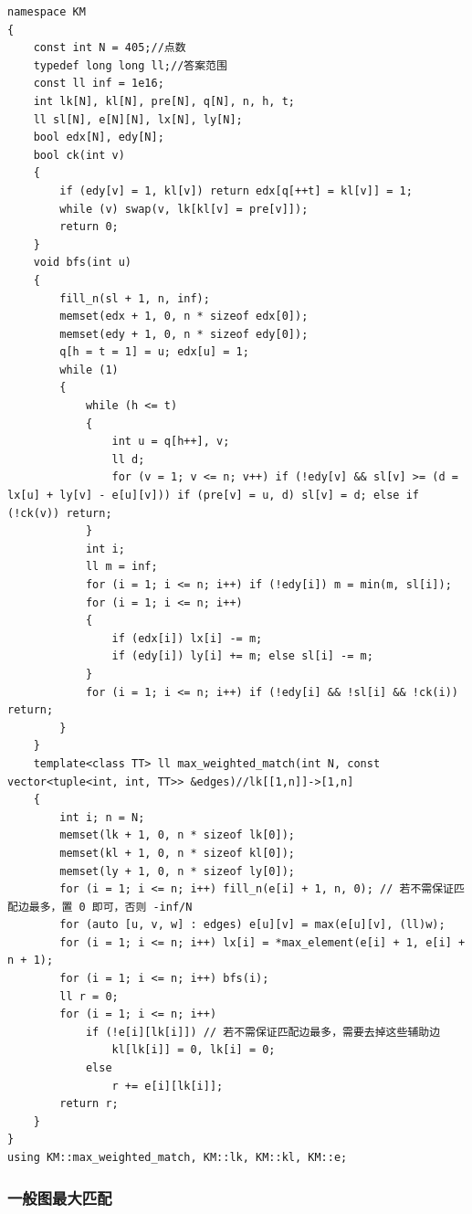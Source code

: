 \documentclass[12pt]{ctexart}
\begin{document}
\begin{lstlisting}
namespace KM
{
	const int N = 405;//点数
	typedef long long ll;//答案范围
	const ll inf = 1e16;
	int lk[N], kl[N], pre[N], q[N], n, h, t;
	ll sl[N], e[N][N], lx[N], ly[N];
	bool edx[N], edy[N];
	bool ck(int v)
	{
		if (edy[v] = 1, kl[v]) return edx[q[++t] = kl[v]] = 1;
		while (v) swap(v, lk[kl[v] = pre[v]]);
		return 0;
	}
	void bfs(int u)
	{
		fill_n(sl + 1, n, inf);
		memset(edx + 1, 0, n * sizeof edx[0]);
		memset(edy + 1, 0, n * sizeof edy[0]);
		q[h = t = 1] = u; edx[u] = 1;
		while (1)
		{
			while (h <= t)
			{
				int u = q[h++], v;
				ll d;
				for (v = 1; v <= n; v++) if (!edy[v] && sl[v] >= (d = lx[u] + ly[v] - e[u][v])) if (pre[v] = u, d) sl[v] = d; else if (!ck(v)) return;
			}
			int i;
			ll m = inf;
			for (i = 1; i <= n; i++) if (!edy[i]) m = min(m, sl[i]);
			for (i = 1; i <= n; i++)
			{
				if (edx[i]) lx[i] -= m;
				if (edy[i]) ly[i] += m; else sl[i] -= m;
			}
			for (i = 1; i <= n; i++) if (!edy[i] && !sl[i] && !ck(i)) return;
		}
	}
	template<class TT> ll max_weighted_match(int N, const vector<tuple<int, int, TT>> &edges)//lk[[1,n]]->[1,n]
	{
		int i; n = N;
		memset(lk + 1, 0, n * sizeof lk[0]);
		memset(kl + 1, 0, n * sizeof kl[0]);
		memset(ly + 1, 0, n * sizeof ly[0]);
		for (i = 1; i <= n; i++) fill_n(e[i] + 1, n, 0); // 若不需保证匹配边最多，置 0 即可，否则 -inf/N
		for (auto [u, v, w] : edges) e[u][v] = max(e[u][v], (ll)w);
		for (i = 1; i <= n; i++) lx[i] = *max_element(e[i] + 1, e[i] + n + 1);
		for (i = 1; i <= n; i++) bfs(i);
		ll r = 0;
        for (i = 1; i <= n; i++)
            if (!e[i][lk[i]]) // 若不需保证匹配边最多，需要去掉这些辅助边
                kl[lk[i]] = 0, lk[i] = 0;
            else
                r += e[i][lk[i]];
		return r;
	}
}
using KM::max_weighted_match, KM::lk, KM::kl, KM::e;

\end{lstlisting}

\subsubsection{一般图最大匹配}
\end{document}
